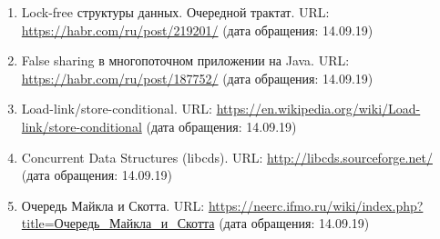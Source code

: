 {\begin{enumerate}
		 языка С++. ISO/IEC 14882:2011. URL: \href{https://www.iso.org/standard/50372.html}{https://www.iso.org/standard/50372.html} (дата обращения: 14.02.19).
		. Проблема АВА. URL: \href{https://ru.wikipedia.org/wiki/%D0%9F%D1%80%D0%BE%D0%B1%D0%BB%D0%B5%D0%BC%D0%B0_ABA} {https://ru.wikipedia.org/wiki/Проблема\_АВА} (дата обращения: 14.02.19).
		 память: история и развитие. URL: \href{https://habr.com/ru/post/221667/}{https://habr.com/ru/post/221667/} (дата обращения: 14.02.19).
		. Модель акторов. URL: \href{https://ru.wikipedia.org/wiki/%D0%9C%D0%BE%D0%B4%D0%B5%D0%BB%D1%8C_%D0%B0%D0%BA%D1%82%D0%BE%D1%80%D0%BE%D0%B2} l{https://ru.wikipedia.org/wiki/Модель\_акторов} (дата обращения: 14.02.19).
		, Томас Х. и др. Алгоритмы: построение и анализ, 3-е изд. : Пер. с англ. - М. : ООО ''И. Д. Вильямс'', 2013. - 1328 с. : ил. - Парал. тит. англ.
		\item Lock-free структуры данных. Очередной трактат. URL: \href{https://habr.com/ru/post/219201/}{https://habr.com/ru/post/219201/} (дата обращения: 14.09.19)
		\item False sharing в многопоточном приложении на Java. URL: \href{https://habr.com/ru/post/187752/}{https://habr.com/ru/post/187752/} (дата обращения: 14.09.19)
		\item Load-link/store-conditional. URL: \href{https://en.wikipedia.org/wiki/Load-link/store-conditional}{https://en.wikipedia.org/wiki/Load-link/store-conditional} (дата обращения: 14.09.19)
		\item Concurrent Data Structures (libcds). URL: \href{http://libcds.sourceforge.net/}{http://libcds.sourceforge.net/} (дата обращения: 14.09.19)
		\item Очередь Майкла и Скотта. URL: \href{https://neerc.ifmo.ru/wiki/index.php?title=%D0%9E%D1%87%D0%B5%D1%80%D0%B5%D0%B4%D1%8C_%D0%9C%D0%B0%D0%B9%D0%BA%D0%BB%D0%B0_%D0%B8_%D0%A1%D0%BA%D0%BE%D1%82%D1%82%D0%B0} {https://neerc.ifmo.ru/wiki/index.php?title=Очередь\_Майкла\_и\_Скотта} (дата обращения: 14.09.19)
	\end{enumerate}
}